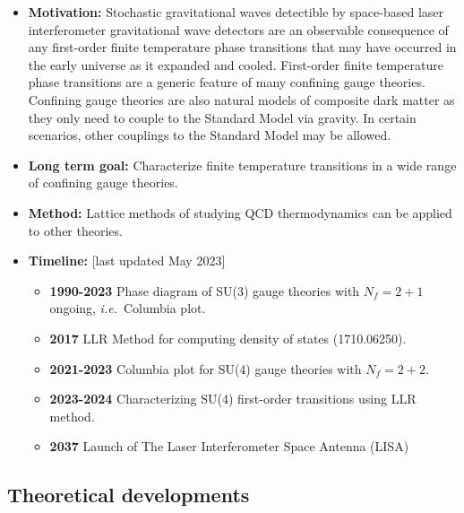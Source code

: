 \documentclass[12pt,hyperpdf]{article}
\begin{document}
\begin{itemize}
   \item { \bf Motivation:} Stochastic gravitational waves detectible by space-based laser interferometer gravitational wave detectors are an observable consequence of any first-order finite temperature phase transitions that may have occurred in the early universe as it expanded and cooled.  First-order finite temperature phase transitions are a generic feature of many confining gauge theories.  Confining gauge theories are also natural models of composite dark matter as they only need to couple to the Standard Model via gravity.  In certain scenarios, other couplings to the Standard Model may be allowed.
   \item { \bf Long term goal:}  Characterize finite temperature transitions in a wide range of confining gauge theories.
   \item {\bf Method:} Lattice methods of studying QCD thermodynamics can be applied to other theories.
\item{\bf Timeline:} \hfill [last updated May 2023]
\begin{itemize}
   \item { \bf 1990-2023} Phase diagram of SU(3) gauge theories with $N_f=2+1$ ongoing, \textit{i.e.}\ Columbia plot.
   \item{ \bf 2017} LLR Method for computing density of states (1710.06250).
   \item{ \bf 2021-2023} Columbia plot for SU(4) gauge theories with $N_f=2+2$. 
   \item{ \bf 2023-2024} Characterizing SU(4) first-order transitions using LLR method. 
   \item{ \bf 2037} Launch of The Laser Interferometer Space Antenna (LISA)
\end{itemize}
\end{itemize}


\subsection{Theoretical developments}
\end{document}

